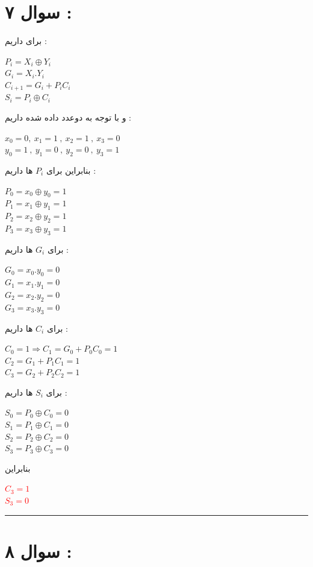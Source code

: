 \documentclass{article}
\begin{document}
\section*{سوال ۷ : }
برای 
داریم  : 
\begin{center}
 $P_i = X_i \oplus Y_i$\\
 $G_i  = X_i  . Y_i$\\
 $C_{i+1} = G_i + P_iC_i$\\
 $S_i = P_i \oplus C_i$
\end{center}
و با توجه به دوعدد داده شده داریم  : 
\begin{center}
	$ x _ 0 = 0  ,  \ x _1 = 1 \ , \  x_2 = 1 \ , \ x_3 = 0$\\
	$y_0 = 1  \ , \ y_1 = 0 \ , \ y_2 = 0  \ , \ y_3 = 1 $
\end{center}
بنابراین برای 
$P_i$
ها داریم  : 
\begin{center}
	$P_0 = x_0 \oplus y_0  = 1 $\\
	$P_1 = x_1 \oplus y_1  = 1 $\\
	$P_2 = x_2 \oplus y_2  = 1 $\\
	$P_3 = x_3 \oplus y_3  = 1 $
\end{center}
برای 
$G_i $
ها داریم  : 
\begin{center}
	$ G_0 = x_0 . y_0 = 0$\\
	$ G_1 = x_1 . y_1 = 0$\\
	$ G_2 = x_2 . y_2 = 0$\\
	$ G_3 = x_3 . y_3 = 0$
\end{center}
برای 
$C_i$
ها داریم  :
\begin{center}
	$C_0 = 1 \Rightarrow C_1 = G_0 + P_0C_0 = 1 $\\
	$C_2 = G_1 + P_1C_1 = 1$\\
	$C_3 = G_2 + P_2C_2 = 1$
\end{center}

برای 
$S_i$
ها داریم  : 
\begin{center}
	$ S_0 = P_0 \oplus C_0 = 0$\\
	$ S_1 = P_1 \oplus C_1 = 0$\\
	$ S_2 = P_2 \oplus C_2 = 0$\\
	$ S_3 = P_3 \oplus C_3 = 0$
\end{center}
بنابراین 
\begin{center}
	\textcolor{red}{$C_3 = 1$} \\
	\textcolor{red}{$S_3 = 0$}
\end{center}
\hrule
\section*{سوال ۸ : }
\end{document}
